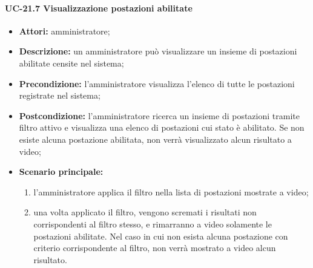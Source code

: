 \paragraph{UC-21.7 Visualizzazione postazioni abilitate}
\begin{itemize}
    \item \textbf{Attori:} amministratore;
    \item \textbf{Descrizione:} un amministratore pu\`{o} visualizzare un insieme di postazioni abilitate censite nel sistema;
    \item \textbf{Precondizione:} l'amministratore visualizza l'elenco di tutte le postazioni registrate nel sistema;
    \item \textbf{Postcondizione:} l'amministratore ricerca un insieme di postazioni tramite filtro attivo e visualizza una elenco di postazioni cui stato è abilitato. Se non esiste alcuna postazione abilitata, non verrà visualizzato alcun risultato a video;
    \item \textbf{Scenario principale:}
    \begin{enumerate}
        \item l'amministratore applica il filtro nella lista di postazioni mostrate a video;
        \item una volta applicato il filtro, vengono scremati i risultati non corrispondenti al filtro stesso, e rimarranno a video solamente le postazioni abilitate. Nel caso in cui non esista alcuna postazione con criterio corrispondente al filtro, non verrà mostrato a video alcun risultato.
    \end{enumerate}
\end{itemize}

